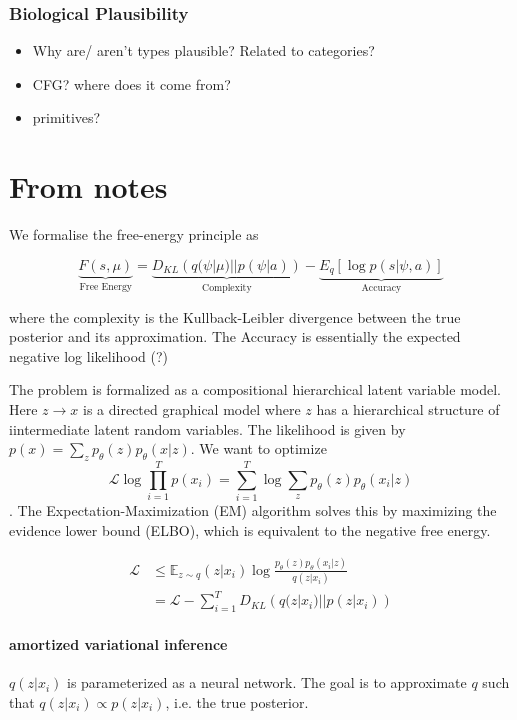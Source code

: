 \subsubsection{Biological Plausibility}
\begin{itemize}
    \item Why are/ aren't types plausible? Related to categories?
    \item CFG? where does it come from?
    \item primitives?
\end{itemize}



\section{From notes}


We formalise the free-energy principle as 

\begin{equation}
    \underbrace{F(s, \mu)}_{\text{Free Energy}} = \underbrace{D_{KL}\left(q(\psi|\mu) || p(\psi|a)\right)}_{\text{Complexity}} - \underbrace{E_q\left[\log p(s|\psi, a)\right]}_{\text{Accuracy}}
\end{equation}

where the complexity is the Kullback-Leibler divergence between the true posterior and its approximation. The Accuracy is essentially the expected negative log likelihood (?)  


The problem is formalized as a compositional hierarchical latent variable model. 
Here $z \rightarrow x$ is a directed graphical model where $z$ has a hierarchical structure of iintermediate latent random variables.
The likelihood is given by $ p(x) = \sum_z p_\theta(z)p_\theta (x|z) $. We want to optimize $$ \mathcal{L} \log \prod_{i=1}^{T} p(x_i) = \sum_{i=1}^{T} \log \sum_{z} p_\theta(z)p_\theta(x_i|z)$$.
The Expectation-Maximization (EM) algorithm solves this by maximizing the evidence lower bound (ELBO), which is equivalent to the negative free energy. 

\begin{align}
    \mathcal{L} & \leq \mathbb{E}_{z \sim q}(z|x_i) \log \frac{p_\theta(z)p_\theta(x_i|z)}{q(z|x_i)} \\
    & = \mathcal{L} - \sum_{i=1}^{T} D_{KL} \left(q(z|x_i) || p(z|x_i) \right)
\end{align}

\paragraph{amortized variational inference}
$q(z|x_i)$ is parameterized as a neural network. The goal is to approximate $q$ such that $q(z|x_i) \propto p(z|x_i)$, i.e. the true posterior. 

